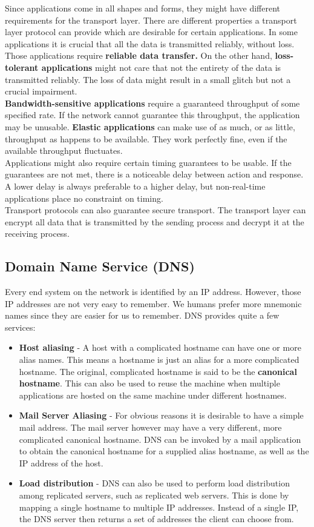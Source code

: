 Since applications come in all shapes and forms, they might have different requirements for the transport layer. There are different properties a transport layer protocol can provide which are desirable for certain applications. In some applications it is crucial that all the data is transmitted reliably, without loss. Those applications require \textbf{reliable data transfer.} On the other hand, \textbf{loss-tolerant applications} might not care that not the entirety of the data is transmitted reliably. The loss of data might result in a small glitch but not a crucial impairment.\\
\textbf{Bandwidth-sensitive applications} require a guaranteed throughput of some specified rate. If the network cannot guarantee this throughput, the application may be unusable. \textbf{Elastic applications} can make use of as much, or as little, throughput as happens to be available. They work perfectly fine, even if the available throughput fluctuates.\\
Applications might also require certain timing guarantees to be usable. If the guarantees are not met, there is a noticeable delay between action and response. A lower delay is always preferable to a higher delay, but non-real-time applications place no constraint on timing.\\
Transport protocols can also guarantee secure transport. The transport layer can encrypt all data that is transmitted by the sending process and decrypt it at the receiving process.

\subsection{Domain Name Service (DNS)}
Every end system on the network is identified by an IP address. However, those IP addresses are not very easy to remember. We humans prefer more mnemonic names since they are easier for us to remember. DNS provides quite a few services:
\begin{itemize}
\item \textbf{Host aliasing} - A host with a complicated hostname can have one or more alias names. This means a hostname is just an alias for a more complicated hostname. The original, complicated hostname is said to be the \textbf{canonical hostname}. This can also be used to reuse the machine when multiple applications are hosted on the same machine under different hostnames.
\item \textbf{Mail Server Aliasing} - For obvious reasons it is desirable to have a simple mail address. The mail server however may have a very different, more complicated canonical hostname. DNS can be invoked by a mail application to obtain the canonical hostname for a supplied alias hostname, as well as the IP address of the host.
\item \textbf{Load distribution} - DNS can also be used to perform load distribution among replicated servers, such as replicated web servers. This is done by mapping a single hostname to multiple IP addresses. Instead of a single IP, the DNS server then returns a set of addresses the client can choose from.
\end{itemize}

